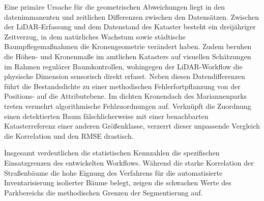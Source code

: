 Eine primäre Ursache für die geometrischen Abweichungen liegt in den datenimmanenten und zeitlichen Differenzen zwischen den Datensätzen. Zwischen der LiDAR-Erfassung und dem Datenstand des Kataster besteht ein dreijähriger Zeitverzug, in dem natürliches Wachstum sowie städtische Baumpflegemaßnahmen die Kronengeometrie verändert haben. Zudem beruhen die Höhen- und Kronenmaße im amtlichen Katasters auf visuellen Schätzungen im Rahmen regulärer Baumkontrollen, wohingegen der LiDAR-Workflow die physische Dimension sensorisch direkt erfasst. Neben diesen Datendifferenzen führt die Bestandsdichte zu einer methodischen Fehlerfortpflanzung von der Positions- auf die Attributebene. Im dichten Kronendach des Mariannenparks treten vermehrt algorithmische Fehlzuordnungen auf. Verknüpft die Zuordnung einen detektierten Baum fälschlicherweise mit einer benachbarten Katasterreferenz einer anderen Größenklasse, verzerrt dieser unpassende Vergleich die Korrelation und den RMSE drastisch.

Insgesamt verdeutlichen die statistischen Kennzahlen die spezifischen Einsatzgrenzen des entwickelten Workflows. Während die starke Korrelation der Straßenbäume die hohe Eignung des Verfahrens für die automatisierte Inventarisierung isolierter Bäume belegt, zeigen die schwachen Werte des Parkbereichs die methodischen Grenzen der Segmentierung auf.